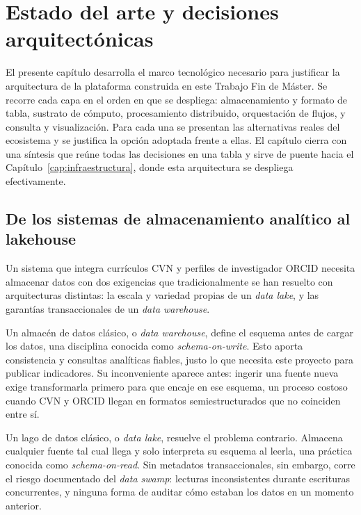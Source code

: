 \chapter{Estado del arte y decisiones arquitectónicas}
\label{cap:estado_arte}

El presente capítulo desarrolla el marco tecnológico necesario para
justificar la arquitectura de la plataforma construida en este Trabajo Fin
de Máster. Se recorre cada capa en el orden en que se despliega:
almacenamiento y formato de tabla, sustrato de cómputo, procesamiento
distribuido, orquestación de flujos, y consulta y visualización. Para cada
una se presentan las alternativas reales del ecosistema y se justifica la
opción adoptada frente a ellas. El capítulo cierra con una síntesis que
reúne todas las decisiones en una tabla y sirve de puente hacia el
Capítulo~\ref{cap:infraestructura}, donde esta arquitectura se despliega
efectivamente.

\section{De los sistemas de almacenamiento analítico al lakehouse}
\label{sec:estado_arte_lakehouse}

Un sistema que integra currículos CVN y perfiles de investigador ORCID
necesita almacenar datos con dos exigencias que tradicionalmente se han
resuelto con arquitecturas distintas: la escala y variedad propias de un
\textit{data lake}, y las garantías transaccionales de un \textit{data
warehouse}.

Un almacén de datos clásico, o \textit{data warehouse}, define el esquema
antes de cargar los datos, una disciplina conocida como
\textit{schema-on-write}. Esto aporta consistencia y consultas analíticas
fiables, justo lo que necesita este proyecto para publicar indicadores. Su
inconveniente aparece antes: ingerir una fuente nueva exige transformarla
primero para que encaje en ese esquema, un proceso costoso cuando CVN y
ORCID llegan en formatos semiestructurados que no coinciden entre sí.

Un lago de datos clásico, o \textit{data lake}, resuelve el problema
contrario. Almacena cualquier fuente tal cual llega y solo interpreta su
esquema al leerla, una práctica conocida como \textit{schema-on-read}. Sin
metadatos transaccionales, sin embargo, corre el riesgo documentado del
\textit{data swamp}: lecturas inconsistentes durante escrituras
concurrentes, y ninguna forma de auditar cómo estaban los datos en un
momento anterior.

